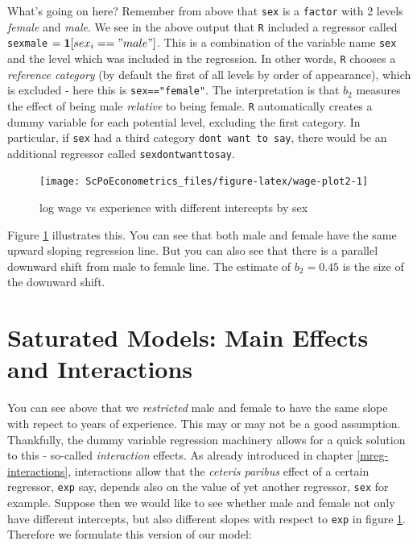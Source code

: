 \documentclass[]{book}
\theoremstyle{definition}
\theoremstyle{definition}
\theoremstyle{definition}
\theoremstyle{remark}
\begin{document}
What's going on here? Remember from above that \texttt{sex} is a
\texttt{factor} with 2 levels \emph{female} and \emph{male}. We see in
the above output that \texttt{R} included a regressor called
\texttt{sexmale} \(=\mathbf{1}[sex_i=="male"]\). This is a combination
of the variable name \texttt{sex} and the level which was included in
the regression. In other words, \texttt{R} chooses a \emph{reference
category} (by default the first of all levels by order of appearance),
which is excluded - here this is \texttt{sex=="female"}. The
interpretation is that \(b_2\) measures the effect of being male
\emph{relative} to being female. \texttt{R} automatically creates a
dummy variable for each potential level, excluding the first category.
In particular, if \texttt{sex} had a third category
\texttt{dont\ want\ to\ say}, there would be an additional regressor
called \texttt{sexdontwanttosay}.

\begin{figure}

{\centering \texttt{[image: ScPoEconometrics\_files/figure-latex/wage-plot2-1]} 

}

\caption{log wage vs experience with different intercepts by sex}\label{fig:wage-plot2}
\end{figure}

Figure \ref{fig:wage-plot2} illustrates this. You can see that both male
and female have the same upward sloping regression line. But you can
also see that there is a parallel downward shift from male to female
line. The estimate of \(b_2 = 0.45\) is the size of the downward shift.

\section{Saturated Models: Main Effects and
Interactions}\label{saturated-models-main-effects-and-interactions}

You can see above that we \emph{restricted} male and female to have the
same slope with repect to years of experience. This may or may not be a
good assumption. Thankfully, the dummy variable regression machinery
allows for a quick solution to this - so-called \emph{interaction}
effects. As already introduced in chapter \ref{mreg-interactions},
interactions allow that the \emph{ceteris paribus} effect of a certain
regressor, \texttt{exp} say, depends also on the value of yet another
regressor, \texttt{sex} for example. Suppose then we would like to see
whether male and female not only have different intercepts, but also
different slopes with respect to \texttt{exp} in figure
\ref{fig:wage-plot2}. Therefore we formulate this version of our model:
\end{document}
